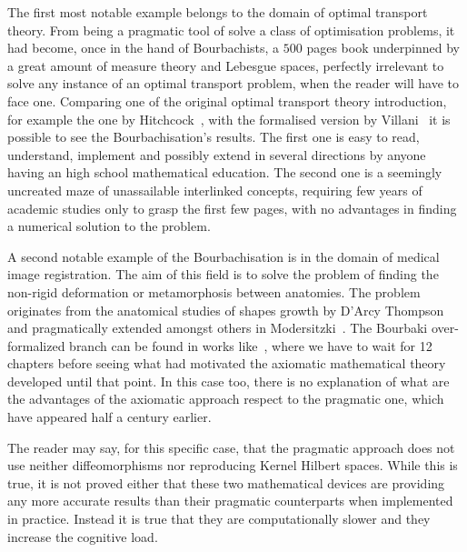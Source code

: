 \documentclass[]{scrartcl}
\theoremstyle{definition}
\begin{document}
The first most notable example belongs to the domain of optimal transport theory. From being a pragmatic tool of solve a class of optimisation problems, it had become, once in the hand of Bourbachists, a $500$ pages book underpinned by a great amount of measure theory and Lebesgue spaces, perfectly irrelevant to solve any instance of an optimal transport problem, when the reader will have to face one. Comparing one of the original optimal transport theory introduction, for example the one by Hitchcock~\cite{hitchcock1941distribution}, with the formalised version by Villani~\cite{villani2003topics} it is possible to see the Bourbachisation's results. The first one is easy to read, understand, implement and possibly extend in several directions by anyone having an high school mathematical education. The second one is a seemingly uncreated maze of unassailable interlinked concepts, requiring few years of academic studies only to grasp the first few pages, with no advantages in finding a numerical solution to the problem. %

A second notable example of the Bourbachisation is in the domain of medical image registration. The aim of this field is to solve the problem of finding the non-rigid deformation or metamorphosis between anatomies. The problem originates from the anatomical studies of shapes growth by D'Arcy Thompson~\cite{d1942growth} and pragmatically extended amongst others in Modersitzki~\cite{modersitzki2004numerical}. The Bourbaki over-formalized branch can be found in works like~\cite{younes2010shapes}, where we have to wait for 12 chapters before seeing what had motivated the axiomatic mathematical theory developed until that point.
In this case too, there is no explanation of what are the advantages of the axiomatic approach respect to the pragmatic one, which have appeared half a century earlier.

The reader may say, for this specific case, that the pragmatic approach \cite{modersitzki2004numerical} does not use neither diffeomorphisms nor reproducing Kernel Hilbert spaces. While this is true, it is not proved either that these two mathematical devices are providing any more accurate results than their pragmatic counterparts when implemented in practice. Instead it is true that they are computationally slower and they increase the cognitive load.
\end{document}

